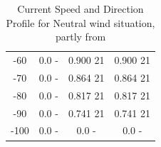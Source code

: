 \begin{table} [H]
\begin{tabular}{ |c|c|c|c|}
  -60 & 0.0 \hspace{0.7cm} - & 0.900 \hspace{0.7cm} 21  & 0.900 \hspace{1.15cm} 21 \\
 -70 & 0.0 \hspace{0.7cm} - & 0.864 \hspace{0.7cm} 21  & 0.864 \hspace{1.15cm} 21 \\
  -80 & 0.0 \hspace{0.7cm} - & 0.817 \hspace{0.7cm} 21  & 0.817 \hspace{1.15cm} 21 \\
 -90 & 0.0 \hspace{0.7cm} - & 0.741 \hspace{0.7cm} 21  & 0.741 \hspace{1.15cm} 21 \\ 
 -100 & 0.0 \hspace{0.7cm} - & 0.0 \hspace{0.7cm} -  & 0.0 \hspace{1.15cm} - \\ 
 \hline
\end{tabular}
\caption{Current Speed and Direction Profile for Neutral wind situation, partly from \cite{Lifes50+D1.1}}
\label{table:tidcur}
\end{table}   


